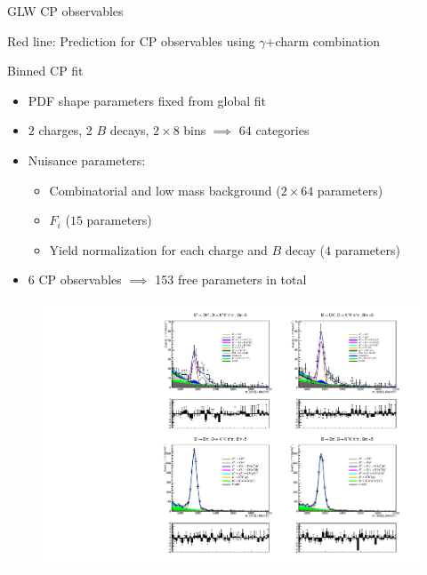 \documentclass{beamer}
\begin{document}
\begin{frame}{GLW CP observables}
\begin{figure}
\begin{subfigure}{0.4\textwidth}
    \end{subfigure}
  \end{figure}
  \begin{center}
    Red line: Prediction for CP observables using $\gamma$+charm combination
  \end{center}
\end{frame}

\begin{frame}{Binned CP fit}
  \begin{itemize}
    \setlength\itemsep{0.0em}
    \item{PDF shape parameters fixed from global fit}
    \item{$2$ charges, 2 $B$ decays, $2\times 8$ bins $\implies$ $64$ categories}
    \item{Nuisance parameters:}
    \begin{itemize}
      \item{Combinatorial and low mass background ($2\times 64$ parameters)}
      \item{$F_i$ ($15$ parameters)}
      \item{Yield normalization for each charge and $B$ decay ($4$ parameters)}
    \end{itemize}
    \item{$6$ CP observables $\implies$ 153 free parameters in total}
  \end{itemize}
  \begin{figure}
    \includegraphics[width = 1.0\textwidth, clip = true, trim = {0 13cm 0 0}]{Plots/d2kkpipi_fiveL_binm5.pdf}
  \end{figure}
\end{frame}
\end{document}

